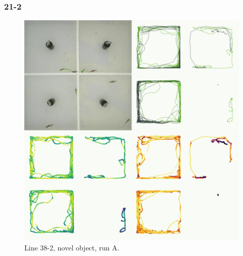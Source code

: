 \documentclass[
]{book}
\begin{document}
\hypertarget{section-10}{%
\subsubsection{21-2}\label{section-10}}



\begin{figure}
\includegraphics[width=1\linewidth]{figs/mikk_behaviour/four_panel_plots/novel_object_20191113_1527_21-2_L_A_300} \caption{Line 38-2, novel object, run A.}\label{fig:4p-21-2-no-A}
\end{figure}
\end{document}

